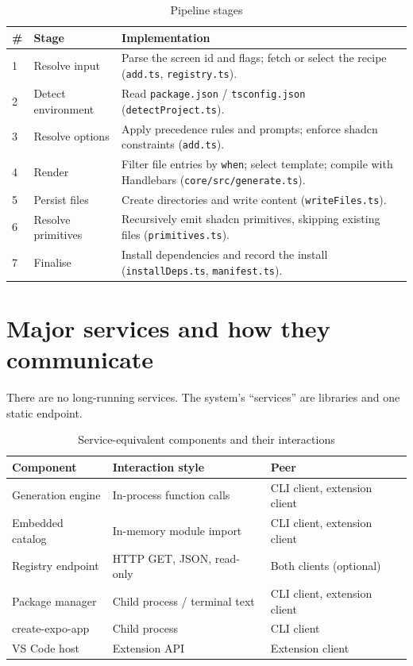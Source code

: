 \begin{longtable}{p{1cm}p{3.8cm}p{9.2cm}}
\caption{Pipeline stages}\\
\toprule
\textbf{\#} & \textbf{Stage} & \textbf{Implementation} \\
\midrule

1 & Resolve input & Parse the screen id and flags; fetch or select the recipe
(\texttt{add.ts}, \texttt{registry.ts}). \\
2 & Detect environment & Read \texttt{package.json} / \texttt{tsconfig.json}
(\texttt{detectProject.ts}). \\
3 & Resolve options & Apply precedence rules and prompts; enforce shadcn
constraints (\texttt{add.ts}). \\
4 & Render & Filter file entries by \texttt{when}; select template; compile with
Handlebars (\texttt{core/src/generate.ts}). \\
5 & Persist files & Create directories and write content
(\texttt{writeFiles.ts}). \\
6 & Resolve primitives & Recursively emit shadcn primitives, skipping existing
files (\texttt{primitives.ts}). \\
7 & Finalise & Install dependencies and record the install
(\texttt{installDeps.ts}, \texttt{manifest.ts}). \\
\bottomrule
\end{longtable}

\section{Major services and how they communicate}

There are no long-running services. The system's ``services'' are libraries and
one static endpoint.

\begin{longtable}{p{3.8cm}p{4.6cm}p{5.6cm}}
\caption{Service-equivalent components and their interactions}\\
\toprule
\textbf{Component} & \textbf{Interaction style} & \textbf{Peer} \\
\midrule

Generation engine & In-process function calls & CLI client, extension client \\
Embedded catalog & In-memory module import & CLI client, extension client \\
Registry endpoint & HTTP GET, JSON, read-only & Both clients (optional) \\
Package manager & Child process / terminal text & CLI client, extension client \\
create-expo-app & Child process & CLI client \\
VS Code host & Extension API & Extension client \\
\bottomrule
\end{longtable}

